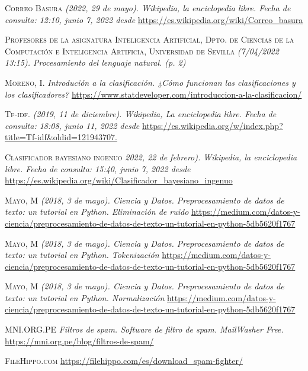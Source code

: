 \documentclass[conference,a4paper]{IEEEtran}
\begin{document}
\begin{thebibliography}{30}
 \textsc{Correo Basura} \textit{(2022, 29 de mayo). Wikipedia, la enciclopedia libre. Fecha de consulta: 12:10, junio 7, 2022 desde} \url{https://es.wikipedia.org/wiki/Correo_basura}

 \textsc{Profesores de la asignatura Inteligencia Artificial, Dpto. de Ciencias de la Computación e Inteligencia Artificia, Universidad de Sevilla} \textit{(7/04/2022 13:15). Procesamiento del lenguaje natural. (p. 2)}

 \textsc{Moreno, I.} \textit{Introdución a la clasificación. ¿Cómo funcionan las clasificaciones y los clasificadores?} \url{https://www.statdeveloper.com/introduccion-a-la-clasificacion/}

 \textsc{Tf-idf.} \textit{(2019, 11 de diciembre). Wikipedia, La enciclopedia libre. Fecha de consulta: 18:08, junio 11, 2022 desde} \url{https://es.wikipedia.org/w/index.php?title=Tf-idf&oldid=121943707.}

 

 \textsc{Clasificador bayesiano ingenuo} \textit{2022, 22 de febrero). Wikipedia, la enciclopedia libre. Fecha de consulta: 15:40, junio 7, 2022 desde} \url{https://es.wikipedia.org/wiki/Clasificador_bayesiano_ingenuo}

 \textsc{Mayo, M} \textit{(2018, 3 de mayo). Ciencia y Datos. Preprocesamiento de datos de texto: un tutorial en Python. Eliminación de ruido} \url{https://medium.com/datos-y-ciencia/preprocesamiento-de-datos-de-texto-un-tutorial-en-python-5db5620f1767}

 \textsc{Mayo, M} \textit{(2018, 3 de mayo). Ciencia y Datos. Preprocesamiento de datos de texto: un tutorial en Python. Tokenización} \url{https://medium.com/datos-y-ciencia/preprocesamiento-de-datos-de-texto-un-tutorial-en-python-5db5620f1767}

 \textsc{Mayo, M} \textit{(2018, 3 de mayo). Ciencia y Datos. Preprocesamiento de datos de texto: un tutorial en Python. Normalización} \url{https://medium.com/datos-y-ciencia/preprocesamiento-de-datos-de-texto-un-tutorial-en-python-5db5620f1767}

 \textsc{MNI.ORG.PE} \textit{Filtros de spam. Software de filtro de spam. MailWasher Free.} \url{https://mni.org.pe/blog/filtros-de-spam/}


 \textsc{FileHippo.com }  \url{https://filehippo.com/es/download_spam-fighter/}


\end{thebibliography}
\end{document}
